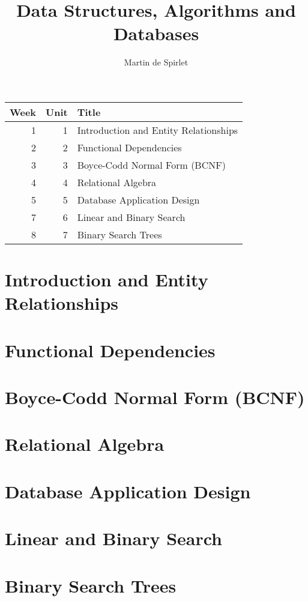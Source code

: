 \documentclass[
  11pt,
  a4paper,
]{article}
\title{Data Structures, Algorithms and Databases}
\author{Martin de Spirlet}
\date{}
\begin{document}

\maketitle

\vspace*{\fill}

\begin{table}[htp]
  \centering
  \begin{tabular}{rrl}
    \toprule
    Week & Unit & Title \\
    \midrule
    1 & 1 & Introduction and Entity Relationships \\
    2 & 2 & Functional Dependencies \\
    3 & 3 & Boyce-Codd Normal Form (BCNF) \\
    4 & 4 & Relational Algebra \\
    5 & 5 & Database Application Design \\
    7 & 6 & Linear and Binary Search \\
    8 & 7 & Binary Search Trees \\
    \bottomrule
  \end{tabular}
\end{table}

\vspace*{\fill}
\addvspace{1in}

\clearpage


\section{Introduction and Entity Relationships}


\section{Functional Dependencies}


\section{Boyce-Codd Normal Form (BCNF)}


\section{Relational Algebra}


\section{Database Application Design}


\section{Linear and Binary Search}


\section{Binary Search Trees}

\end{document}

